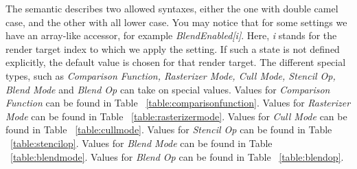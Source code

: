 \documentclass{article}
\begin{document}
The semantic describes two allowed syntaxes, either the one with double camel case, and the other with all lower case. You may notice that for some settings we have an array-like accessor, for example \textit{BlendEnabled[i]}. Here, \textit{i} stands for the render target index to which we apply the setting. If such a state is not defined explicitly, the default value is chosen for that render target. The different special types, such as \textit{Comparison Function, Rasterizer Mode, Cull Mode, Stencil Op, Blend Mode} and \textit{Blend Op} can take on special values. Values for \textit{Comparison Function} can be found in Table ~\ref{table:comparisonfunction}. Values for \textit{Rasterizer Mode} can be found in Table ~\ref{table:rasterizermode}. Values for \textit{Cull Mode} can be found in Table ~\ref{table:cullmode}. Values for \textit{Stencil Op} can be found in Table ~\ref{table:stencilop}. Values for \textit{Blend Mode} can be found in Table ~\ref{table:blendmode}. Values for \textit{Blend Op} can be found in Table ~\ref{table:blendop}. 

\begin{table}[float]
\caption{Comparison Function}
\label{table:comparisonfunction}
\end{table}

\begin{table}[float]
\caption{Rasterizer Mode}
\label{table:rasterizermode}
\end{table}
\end{document}

